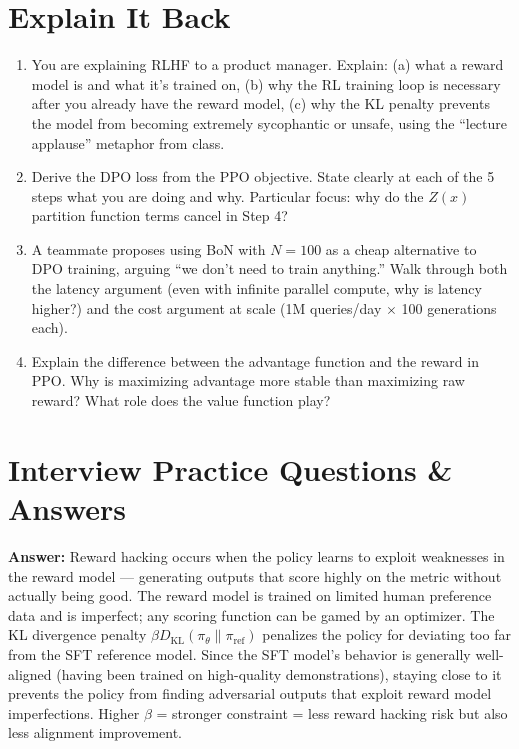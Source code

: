 \documentclass[11pt, a4paper]{article}
\begin{document}
\newpage
\section{Explain It Back}

\begin{enumerate}[leftmargin=2em]
  \item You are explaining RLHF to a product manager. Explain: (a) what a reward model is and what it's trained on, (b) why the RL training loop is necessary after you already have the reward model, (c) why the KL penalty prevents the model from becoming extremely sycophantic or unsafe, using the ``lecture applause'' metaphor from class.

  \item Derive the DPO loss from the PPO objective. State clearly at each of the 5 steps what you are doing and why. Particular focus: why do the $Z(x)$ partition function terms cancel in Step 4?

  \item A teammate proposes using BoN with $N=100$ as a cheap alternative to DPO training, arguing ``we don't need to train anything.'' Walk through both the latency argument (even with infinite parallel compute, why is latency higher?) and the cost argument at scale (1M queries/day $\times$ 100 generations each).

  \item Explain the difference between the advantage function and the reward in PPO. Why is maximizing advantage more stable than maximizing raw reward? What role does the value function play?
\end{enumerate}

\newpage
\section{Interview Practice Questions \& Answers}

\begin{notebox}
\textbf{Answer:} Reward hacking occurs when the policy learns to exploit weaknesses in the reward model --- generating outputs that score highly on the metric without actually being good. The reward model is trained on limited human preference data and is imperfect; any scoring function can be gamed by an optimizer. The KL divergence penalty $\beta D_{\text{KL}}(\pi_\theta \| \pi_{\text{ref}})$ penalizes the policy for deviating too far from the SFT reference model. Since the SFT model's behavior is generally well-aligned (having been trained on high-quality demonstrations), staying close to it prevents the policy from finding adversarial outputs that exploit reward model imperfections. Higher $\beta$ = stronger constraint = less reward hacking risk but also less alignment improvement.
\end{notebox}
\end{document}
